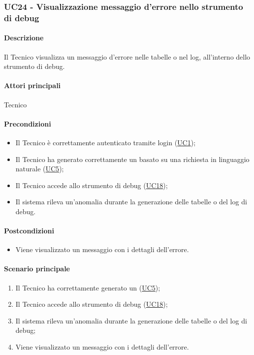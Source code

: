 \subsubsection{UC24 - Visualizzazione messaggio d'errore nello strumento di debug}\label{UC23}
\paragraph*{Descrizione}
Il Tecnico visualizza un messaggio d'errore nelle tabelle o nel log, all'interno dello strumento di debug. 

\paragraph*{Attori principali}
Tecnico

\paragraph*{Precondizioni}
\begin{itemize}
  \item Il Tecnico è correttamente autenticato tramite login (\hyperref[UC1]{UC1});
  \item Il Tecnico ha generato correttamente un  basato su una richiesta in linguaggio naturale (\hyperref[UC5]{UC5});
  \item Il Tecnico accede allo strumento di debug (\hyperref[UC18]{UC18});
  \item Il sistema rileva un'anomalia durante la generazione delle tabelle o del log di debug.
\end{itemize}

\paragraph*{Postcondizioni}
\begin{itemize}
  \item Viene visualizzato un messaggio con i dettagli dell'errore.
\end{itemize}

\paragraph*{Scenario principale}
\begin{enumerate}
  \item Il Tecnico ha correttamente generato un  (\hyperref[UC5]{UC5});
  \item Il Tecnico accede allo strumento di debug (\hyperref[UC18]{UC18});
  \item Il sistema rileva un'anomalia durante la generazione delle tabelle o del log di debug;
  \item Viene visualizzato un messaggio con i dettagli dell'errore.
\end{enumerate}
